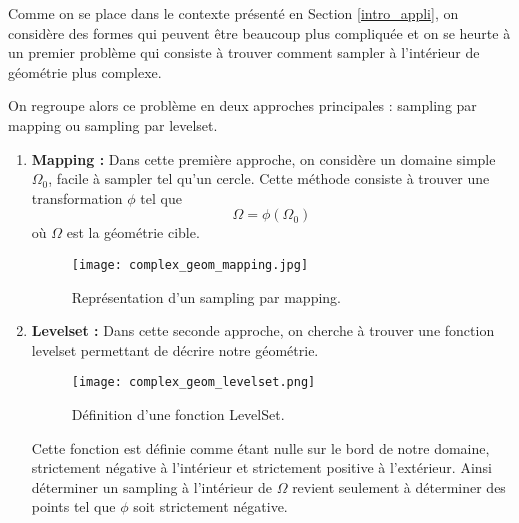 Comme on se place dans le contexte présenté en Section \ref{intro_appli}, on considère des formes qui peuvent être beaucoup plus compliquée et on se heurte à un premier problème qui consiste à trouver comment sampler à l'intérieur de géométrie plus complexe.

On regroupe alors ce problème en deux approches principales : sampling par mapping ou sampling par levelset.

\begin{enumerate}[label=\textbullet]
	\item \textbf{Mapping :} Dans cette première approche, on considère un domaine simple $\Omega_0$, facile à sampler tel qu'un cercle. Cette méthode consiste à trouver une transformation $\phi$ tel que
	\begin{equation*}
		\Omega = \phi(\Omega_0)
	\end{equation*}
	où $\Omega$ est la géométrie cible.
	\begin{figure}[H]
		\centering
		\texttt{[image: complex\_geom\_mapping.jpg]}
		\caption{Représentation d'un sampling par mapping.}
	\end{figure}

	\item \textbf{Levelset :} Dans cette seconde approche, on cherche à trouver une fonction levelset permettant de décrire notre géométrie.
	\begin{figure}[H]
		\centering
		\texttt{[image: complex\_geom\_levelset.png]}
		\caption{Définition d'une fonction LevelSet.}
	\end{figure}
	Cette fonction est définie comme étant nulle sur le bord de notre domaine, strictement négative à l'intérieur et strictement positive à l'extérieur. Ainsi déterminer un sampling à l'intérieur de $\Omega$ revient seulement à déterminer des points tel que $\phi$ soit strictement négative.
\end{enumerate}

